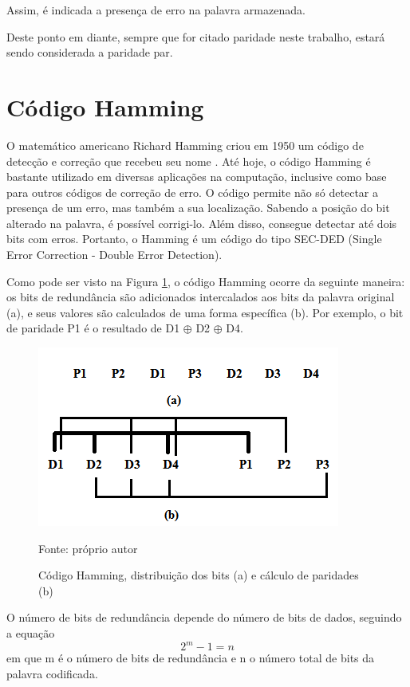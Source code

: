 Assim, é indicada a presença de erro na palavra armazenada.

Deste ponto em diante, sempre que for citado paridade neste trabalho, estará sendo considerada a paridade par.


\section{Código Hamming}

O matemático americano Richard Hamming criou em 1950 um código de detecção e correção que recebeu seu nome \cite{milies2009breve}. Até hoje, o código Hamming é bastante utilizado em diversas aplicações na computação, inclusive como base para outros códigos de correção de erro. O código permite não só detectar a presença de um erro, mas também a sua localização. Sabendo a posição do bit alterado na palavra, é possível corrigi-lo. Além disso, consegue detectar até dois bits com erros. Portanto, o Hamming é um código do tipo SEC-DED (Single Error Correction - Double Error Detection).

Como pode ser visto na Figura \ref{fig:hamming}, o código Hamming ocorre da seguinte maneira: os bits de redundância são adicionados intercalados aos bits da palavra original (a), e seus valores são calculados de uma forma específica (b). Por exemplo, o bit de paridade P1 é o resultado de D1 $\oplus$ D2 $\oplus$ D4.

\begin{figure}[ht]
    \centering
    \includegraphics[scale=0.7]{figuras/hamming.png}
    \caption{Código Hamming, distribuição dos bits (a) e cálculo de paridades (b)}{Fonte: próprio autor}
    \label{fig:hamming}
\end{figure}

O número de bits de redundância depende do número de bits de dados, seguindo a equação 
\begin{equation}
    2^m-1=n
\end{equation}
em que m é o número de bits de redundância e n o número total de bits da palavra codificada.



